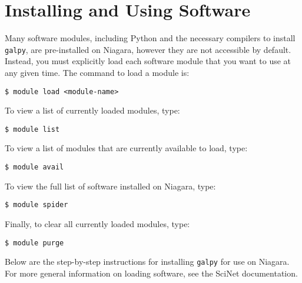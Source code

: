 \documentclass[12pt]{article}
\begin{document}
\section{Installing and Using Software}
Many software modules, including Python and the necessary compilers to install \texttt{galpy}, are pre-installed on Niagara, however they are not accessible by default. Instead, you must explicitly load each software module that you want to use at any given time. The command to load a module is:
\begin{lstlisting}
$ module load <module-name>
\end{lstlisting}
To view a list of currently loaded modules, type:
\begin{lstlisting}
$ module list
\end{lstlisting}
To view a list of modules that are currently available to load, type:
\begin{lstlisting}
$ module avail
\end{lstlisting}
To view the full list of software installed on Niagara, type:
\begin{lstlisting}
$ module spider
\end{lstlisting}
Finally, to clear all currently loaded modules, type:
\begin{lstlisting}
$ module purge
\end{lstlisting}
Below are the step-by-step instructions for installing \texttt{galpy} for use on Niagara. For more general information on loading software, see the SciNet documentation.
\end{document}
